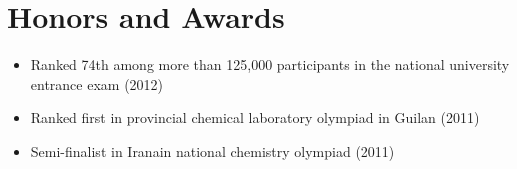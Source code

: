 \documentclass[a4paper,10pt]{article} %
\begin{document}
\color{blue}
\section{Honors and Awards }

\color{Black}
\begin{itemize}
\item
Ranked 74th among more than 125,000  participants in the national university entrance exam  \hfill(2012)
	\item
Ranked first in provincial chemical laboratory olympiad in Guilan  \hfill(2011)  
\item
Semi-finalist in Iranain national chemistry olympiad \hfill(2011) 
\end{itemize}
\color{blue}


\color{blue}
\end{document}
